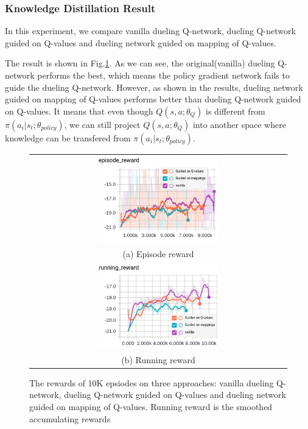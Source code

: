 \subsubsection{Knowledge Distillation Result}

In this experiment, we compare vanilla dueling Q-network, dueling Q-network guided on Q-values and dueling network guided on mapping of Q-values.

The result is shown in Fig.\ref{fig:mimic_result}. As we can see, the original(vanilla) dueling Q-network performs the best, which means the policy gradient network fails to guide the dueling Q-network.
%
However, as shown in the results, dueling network guided on mapping of Q-values performs better than dueling Q-network guided on Q-values. It means that even though $Q(s,a;\theta_{Q})$ is different from $\pi(a_i|s_t;\theta_{policy})$, we can still project $Q(s,a;\theta_{Q})$ into another space where knowledge can be transfered from $\pi(a_i|s_t;\theta_{policy})$.
\begin{figure}[h!]
	\centering
	\begin{tabular}{c}
		\includegraphics[width=0.49\textwidth]{./fig/mimic_result_episode.png} \\
		(a) Episode reward \\
		\includegraphics[width=0.49\textwidth]{./fig/mimic_result_running.png} \\
		(b) Running reward \\
	\end{tabular}
	\caption{The rewards of 10K epsiodes on three approaches: vanilla dueling Q-network, dueling Q-network guided on Q-values and dueling network guided on mapping of Q-values. Running reward is the smoothed accumulating rewards}
	\label{fig:mimic_result}
\end{figure}



